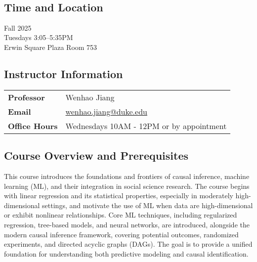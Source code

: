 \documentclass[12pt]{article}
\begin{document}
\noindent {\Large \textcolor{titlecolor}{SOC 690S Machine Learning in Causal Inference \\[3pt] Methodological Foundations and Sociological Applications}}\\[0pt]

\subsection*{Time and Location}

Fall 2025\\
Tuesdays 3:05--5:35PM\\
Erwin Square Plaza Room 753

\vspace{0.5em}

\subsection*{Instructor Information}

\begin{tabular}{@{}l l@{}}
\textbf{\textcolor{titlecolor}{Professor}} & Wenhao Jiang \\
\textbf{\textcolor{titlecolor}{Email}} & \href{mailto:wenhao.jiang@duke.edu}{wenhao.jiang@duke.edu} \\
\textbf{\textcolor{titlecolor}{Office Hours}} & Wednesdays 10AM - 12PM or by appointment \\
\end{tabular}

\vspace{0.5em}

\subsection*{Course Overview and Prerequisites}

This course introduces the foundations and frontiers of causal inference, machine learning (ML), and their integration in social science research. The course begins with linear regression and its statistical properties, especially in moderately high-dimensional settings, and motivate the use of ML when data are high-dimensional or exhibit nonlinear relationships. Core ML techniques, including regularized regression, tree-based models, and neural networks, are introduced, alongside the modern causal inference framework, covering potential outcomes, randomized experiments, and directed acyclic graphs (DAGs). The goal is to provide a unified foundation for understanding both predictive modeling and causal identification.
\end{document}
